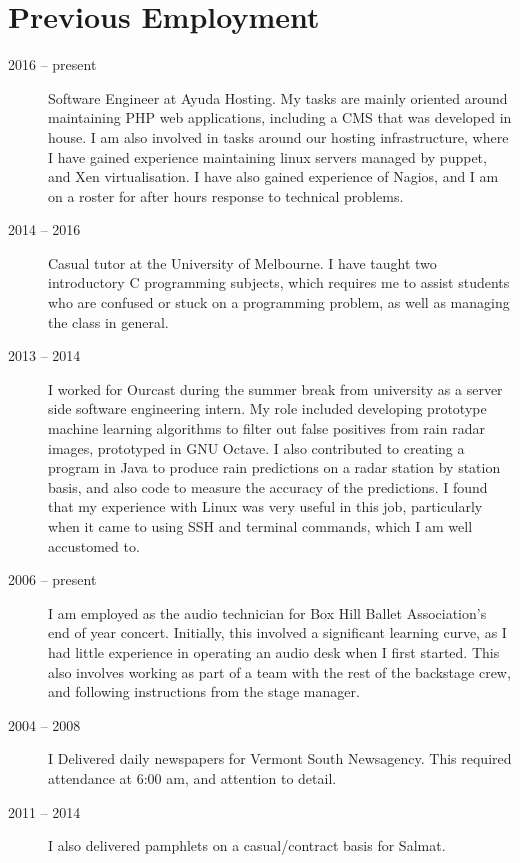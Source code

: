 \documentclass[a4paper]{article}
\begin{document}
\section{Previous Employment}
\begin{description}
    \item[2016 -- present] Software Engineer at Ayuda Hosting. My tasks
        are mainly oriented around maintaining PHP web applications,
        including a CMS that was developed in house. I am also involved in
        tasks around our hosting infrastructure, where I have gained
        experience maintaining linux servers managed by puppet, and Xen
        virtualisation. I have also gained experience of Nagios, and I am
        on a roster for after hours response to technical problems.
    \item[2014 -- 2016] Casual tutor at the University of Melbourne. I
        have taught two introductory C programming subjects, which requires
        me to assist students who are confused or stuck on a programming
        problem, as well as managing the class in general.
    \item[2013 -- 2014] I worked for Ourcast during the summer break from
        university as a server side software engineering intern. My role
        included developing prototype machine learning algorithms to filter
        out false positives from rain radar images, prototyped in GNU 
        Octave. I also contributed to creating a program in Java to produce
        rain predictions on a radar station by station basis, and also code
        to measure the accuracy of the predictions. I found that my
        experience with Linux was very useful in this job, particularly when
        it came to using SSH and terminal commands, which I am well accustomed
        to.
    \item[2006 -- present] I am employed as the audio technician for Box
        Hill Ballet Association's end of year concert. Initially, this 
        involved a significant learning curve, as I had little experience 
        in operating an audio desk when I first started. This also involves 
        working as part of a team with the rest of the backstage crew, and
        following instructions from the stage manager.
    \item[2004 -- 2008] I Delivered daily newspapers for Vermont South
        Newsagency. This required attendance at 6:00 am, and attention to
        detail.
    \item[2011 -- 2014] I also delivered pamphlets on a casual/contract
        basis for Salmat.
\end{description}
\end{document}

